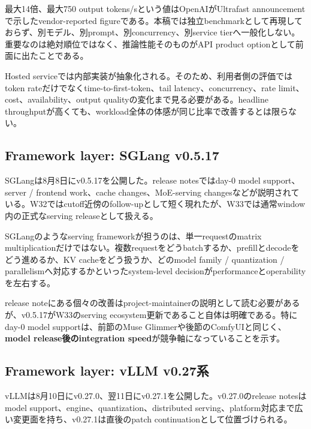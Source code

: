 \begin{claimboundary}
最大14倍、最大750 output tokens/sという値はOpenAIがUltrafast announcementで示したvendor-reported figureである\cite{openai-ultrafast}。本稿では独立benchmarkとして再現しておらず、別モデル、別prompt、別concurrency、別service tierへ一般化しない。重要なのは絶対順位ではなく、推論性能そのものがAPI product optionとして前面に出たことである。
\end{claimboundary}

Hosted serviceでは内部実装が抽象化される。そのため、利用者側の評価ではtoken rateだけでなくtime-to-first-token、tail latency、concurrency、rate limit、cost、availability、output qualityの変化まで見る必要がある。headline throughputが高くても、workload全体の体感が同じ比率で改善するとは限らない。

\subsection*{Framework layer: SGLang v0.5.17}

SGLangは8月8日にv0.5.17を公開した\cite{sglang-0517-w33}。release notesではday-0 model support、server / frontend work、cache changes、MoE-serving changesなどが説明されている。W32ではcutoff近傍のfollow-upとして短く現れたが、W33では通常window内の正式なserving releaseとして扱える。

SGLangのようなserving frameworkが担うのは、単一requestのmatrix multiplicationだけではない。複数requestをどうbatchするか、prefillとdecodeをどう進めるか、KV cacheをどう扱うか、どのmodel family / quantization / parallelismへ対応するかといったsystem-level decisionがperformanceとoperabilityを左右する。

release noteにある個々の改善はproject-maintainerの説明として読む必要があるが、v0.5.17がW33のserving ecosystem更新であること自体は明確である。特にday-0 model supportは、前節のMuse Glimmerや後節のComfyUIと同じく、\textbf{model release後のintegration speed}が競争軸になっていることを示す。

\subsection*{Framework layer: vLLM v0.27系}

vLLMは8月10日にv0.27.0、翌11日にv0.27.1を公開した\cite{vllm-0270,vllm-0271}。v0.27.0のrelease notesはmodel support、engine、quantization、distributed serving、platform対応まで広い変更面を持ち、v0.27.1は直後のpatch continuationとして位置づけられる。

